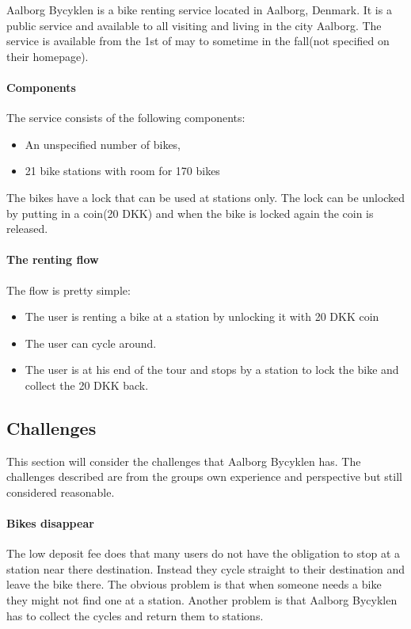 \label{aalborg_bycyklen}
Aalborg Bycyklen is a bike renting service located in Aalborg, Denmark.
It is a public service and available to all visiting and living in the city Aalborg.
The service is available from the 1st of may to sometime in the fall(not specified on their homepage).
\cite{aalborgbycyklenbagcyklen}

\paragraph{Components}
The service consists of the following components:
\begin{itemize}
\item An unspecified number of bikes, 
\item 21 bike stations with room for 170 bikes
\end{itemize}
The bikes have a lock that can be used at stations only.
The lock can be unlocked by putting in a coin(20 DKK) and when the bike is locked again the coin is released.

\paragraph{The renting flow}
The flow is pretty simple:
\begin{itemize}
\item The user is renting a bike at a station by unlocking it with 20 DKK coin
\item The user can cycle around.
\item The user is at his end of the tour and stops by a station to lock the bike and collect the 20 DKK back.
\end{itemize}

\subsection{Challenges}\label{aalborg_bycyklen:challenges}
This section will consider the challenges that Aalborg Bycyklen has.
The challenges described are from the groups own experience and perspective but still considered reasonable.

\paragraph{Bikes disappear}
The low deposit fee does that many users do not have the obligation to stop at a station near there destination.
Instead they cycle straight to their destination and leave the bike there.
The obvious problem is that when someone needs a bike they might not find one at a station.
Another problem is that Aalborg Bycyklen has to collect the cycles and return them to stations.

